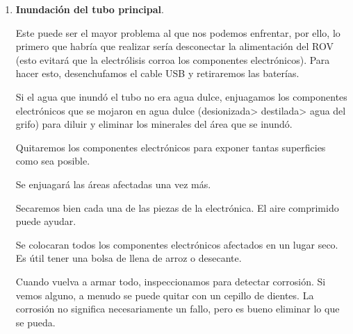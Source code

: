 \begin{enumerate}
\item \textbf{Inundación del tubo principal}.

Este puede ser el mayor problema al que nos podemos enfrentar, por ello, lo primero que habría que realizar sería desconectar la alimentación del ROV (esto evitará que la electrólisis corroa los componentes electrónicos). Para hacer esto, desenchufamos el cable USB y retiraremos las baterías.

Si el agua que inundó el tubo no era agua dulce, enjuagamos los componentes electrónicos que se mojaron en agua dulce (desionizada> destilada> agua del grifo) para diluir y eliminar los minerales del área que se inundó.

Quitaremos los componentes electrónicos para exponer tantas superficies como sea posible.

Se enjuagará las áreas afectadas una vez más.

Secaremos bien cada una de las piezas de la electrónica. El aire comprimido puede ayudar.

Se colocaran todos los componentes electrónicos afectados en un lugar seco. Es útil tener una bolsa de llena de arroz o desecante.

Cuando vuelva a armar todo, inspeccionamos para detectar corrosión. Si vemos alguno, a menudo se puede quitar con un cepillo de dientes. La corrosión no significa necesariamente un fallo, pero es bueno eliminar lo que se pueda.
\end{enumerate}
